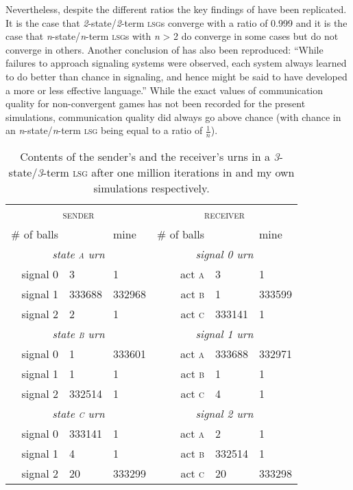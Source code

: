 \documentclass[
	DIV=calc,
	BCOR=0mm,
	pagesize,
	titlepage
]{scrartcl}
\newcommand{\lsg}{\textsc{lsg}}
\newcommand{\nslsg}[1]{\textit{#1}-state/\textit{#1}-term \lsg}
\begin{document}
Nevertheless, despite the different ratios the key findings of \citet{barrett_numerical_2006} have been replicated.
It is the case that \nslsg{2}s converge with a ratio of 0.999 and it is the case that \nslsg{n}s with \textit{n} > 2 do converge in some cases but do not converge in others.
Another conclusion of \citet[sec.~2, unpaginated preprint]{barrett_numerical_2006} has also been reproduced: ``While failures to approach signaling systems were observed, each system always learned to do better than chance in signaling, and hence might be said to have developed a more or less effective language.''
While the exact values of communication quality for non-convergent games has not been recorded for the present simulations, communication quality did always go above chance (with chance in an \nslsg{n} being equal to a ratio of \(\frac{1}{n}\)).

\begin{table}
	\centering
	\begin{tabular}{rllrll}
		\toprule
		\multicolumn{3}{c}{\textsc{sender}} & \multicolumn{3}{c}{\textsc{receiver}} \\
		\cmidrule(lr){1-3}\cmidrule(lr){4-6}
		\# of balls & \citeauthor{barrett_numerical_2006} & mine & \# of balls & \citeauthor{barrett_numerical_2006} & mine \\
		\midrule
		\multicolumn{3}{c}{\emph{state \textsc{a} urn}} & \multicolumn{3}{c}{\emph{signal 0 urn}} \\
		\cmidrule(lr){1-3}\cmidrule(lr){4-6}
		signal 0 & 3      & 1      & act \textsc{a} & 3      & 1 \\
		signal 1 & 333688 & 332968 & act \textsc{b} & 1      & 333599 \\
		signal 2 & 2      & 1      & act \textsc{c} & 333141 & 1 \\
		\midrule
		\multicolumn{3}{c}{\emph{state \textsc{b} urn}} & \multicolumn{3}{c}{\emph{signal 1 urn}} \\
		\cmidrule(lr){1-3}\cmidrule(lr){4-6}
		signal 0 & 1      & 333601 & act \textsc{a} & 333688 & 332971 \\
		signal 1 & 1      & 1      & act \textsc{b} & 1      & 1 \\
		signal 2 & 332514 & 1      & act \textsc{c} & 4      & 1 \\
		\midrule
		\multicolumn{3}{c}{\emph{state \textsc{c} urn}} & \multicolumn{3}{c}{\emph{signal 2 urn}} \\
		\cmidrule(lr){1-3}\cmidrule(lr){4-6}
		signal 0 & 333141 & 1      & act \textsc{a} & 2      & 1 \\
		signal 1 & 4      & 1      & act \textsc{b} & 332514 & 1 \\
		signal 2 & 20     & 333299 & act \textsc{c} & 20     & 333298 \\
		\bottomrule
	\end{tabular}
	\caption{Contents of the sender's and the receiver's urns in a \nslsg{3} after one million iterations in  and my own simulations respectively.}
	\label{tab:urns}
\end{table}
\end{document}
